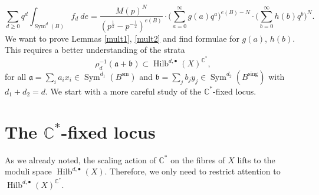 \documentclass{amsart}
\theoremstyle{definition}
\newcommand{\CC} {\mathbb{C}}          %
\newcommand{\Sym}{\operatorname{Sym}}
\newcommand{\Hilb}{\operatorname{Hilb}}
\newcommand{\sm}{\operatorname{sm}}
\newcommand{\sing}{\operatorname{sing}}
\begin{document}
$$
\sum_{d \geq 0} q^d \int_{\Sym^d(B)} f_d \ de = \frac{M(p)^{N}}{(p^{\frac{1}{2}} - p^{-\frac{1}{2}})^{e(B)}} \cdot \Big( \sum_{a=0}^{\infty} g(a) q^a \Big)^{e(B) - N} \cdot \Big( \sum_{b=0}^{\infty} h(b) q^b \Big)^N.
$$
We want to prove Lemmas \ref{mult1}, \ref{mult2} and find formulae for $g(a)$, $h(b)$. This requires a better understanding of the strata
$$
\rho_{d}^{-1} (\mathfrak{a} + \mathfrak{b}) \subset \Hilb^{d, \bullet}(X)^{\CC^*},
$$
for all $\mathfrak{a} = \sum_i a_i x_i \in \Sym^{d_1}(B^{\sm})$ and $\mathfrak{b} = \sum_j b_j y_j \in \Sym^{d_2}(B^{\sing})$ with $d_1+d_2=d$. We start with a more careful study of the $\CC^*$-fixed locus.




\section{The $\CC^*$-fixed locus} \label{fixedlocus}

As we already noted, the scaling action of $\CC^*$ on the fibres of $X$ lifts to the moduli space $\Hilb^{d,\bullet}(X)$. 
Therefore, we only need to restrict attention to $\Hilb^{d,\bullet}(X)^{\CC^*}$. 
\end{document}
